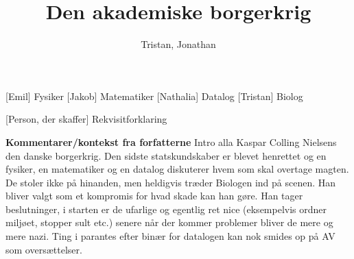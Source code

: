 \documentclass[a4paper,11pt]{article}
\title{Den akademiske borgerkrig}
\author{Tristan, Jonathan}
\begin{document}
\maketitle

\begin{roles}
    [Emil] Fysiker
    [Jakob] Matematiker
    [Nathalia] Datalog
    [Tristan] Biolog
\end{roles}

\begin{props}
    [Person, der skaffer] Rekvisitforklaring
\end{props}

\textbf{Kommentarer/kontekst fra forfatterne}
Intro alla Kaspar Colling Nielsens den danske borgerkrig. Den sidste statskundskaber er blevet henrettet og en fysiker, en matematiker og en datalog diskuterer hvem som skal overtage magten. De stoler ikke på hinanden, men heldigvis træder Biologen ind på scenen. Han bliver valgt som et kompromis for hvad skade kan han gøre. Han tager beslutninger, i starten er de ufarlige og egentlig ret nice (eksempelvis ordner miljøet, stopper sult etc.) senere når der kommer problemer bliver de mere og mere nazi. Ting i parantes efter binær for datalogen kan nok smides op på AV som oversættelser. 
\end{document}
